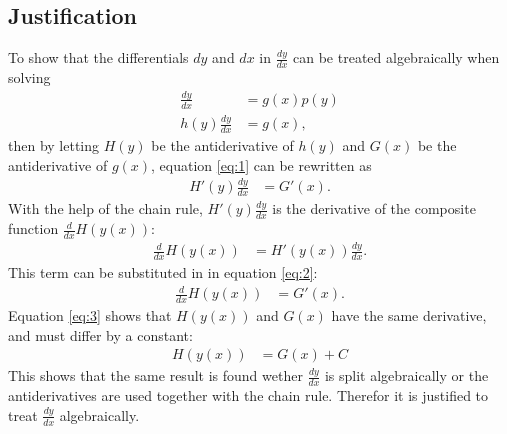 \subsection{Justification} 
To show that the differentials $dy$ and $dx$ in $\frac{dy}{dx}$ can be treated algebraically when solving 
 \begin{align}
	\frac{dy}{dx} &= g(x)p(y)\nonumber\\
	h(y)\frac{dy}{dx} &= g(x)\label{eq:1},
 \end{align}
then by letting $H(y)$ be the antiderivative of $h(y)$ and $G(x)$ be the antiderivative of $g(x)$, equation \ref{eq:1} can be rewritten as 
 \begin{align}
 	H'(y)\frac{dy}{dx} &= G'(x)\label{eq:2}.
 \end{align}
With the help of the chain rule, $H'(y)\frac{dy}{dx}$ is the derivative of the composite function $\frac{d}{dx}H(y(x))$:
 \begin{align*}
	\frac{d}{dx} H(y(x)) &= H'(y(x))\frac{dy}{dx}.
 \end{align*}
This term can be substituted in in equation \ref{eq:2}:
 \begin{align}
 	\frac{d}{dx}H(y(x)) &= G'(x)\label{eq:3}.
 \end{align}
Equation \ref{eq:3} shows that $H(y(x))$ and $G(x)$ have the same derivative, and must differ by a constant:
 \begin{align*}
 	H(y(x)) &= G(x) + C
 \end{align*}
This shows that the same result is found wether $\frac{dy}{dx}$ is split algebraically or the antiderivatives are used together with the chain rule. Therefor it is justified to treat $\frac{dy}{dx}$ algebraically.